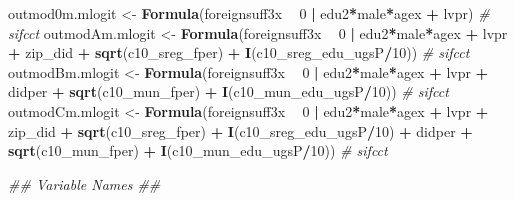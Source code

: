 \documentclass[
]{article}
\newenvironment{Shaded}{\begin{snugshade}}{\end{snugshade}}
\newcommand{\CommentTok}[1]{\textcolor[rgb]{0.56,0.35,0.01}{\textit{#1}}}
\newcommand{\DecValTok}[1]{\textcolor[rgb]{0.00,0.00,0.81}{#1}}
\newcommand{\KeywordTok}[1]{\textcolor[rgb]{0.13,0.29,0.53}{\textbf{#1}}}
\newcommand{\NormalTok}[1]{#1}
\newcommand{\OperatorTok}[1]{\textcolor[rgb]{0.81,0.36,0.00}{\textbf{#1}}}
\newcommand{\StringTok}[1]{\textcolor[rgb]{0.31,0.60,0.02}{#1}}
\begin{document}
\begin{Shaded}
\begin{Highlighting}[]
\NormalTok{outmod0m.mlogit <-}\StringTok{ }\KeywordTok{Formula}\NormalTok{(foreignsuff3x  }\OperatorTok{~}\StringTok{ }\DecValTok{0} \OperatorTok{|}\StringTok{ }\NormalTok{edu2}\OperatorTok{*}\NormalTok{male}\OperatorTok{*}\NormalTok{agex }\OperatorTok{+}\StringTok{ }\NormalTok{lvpr) }\CommentTok{# sifcct}
\NormalTok{outmodAm.mlogit <-}\StringTok{ }\KeywordTok{Formula}\NormalTok{(foreignsuff3x  }\OperatorTok{~}\StringTok{ }\DecValTok{0} \OperatorTok{|}\StringTok{ }\NormalTok{edu2}\OperatorTok{*}\NormalTok{male}\OperatorTok{*}\NormalTok{agex }\OperatorTok{+}\StringTok{ }\NormalTok{lvpr }\OperatorTok{+}\StringTok{  }
\StringTok{                             }\NormalTok{zip_did }\OperatorTok{+}\StringTok{ }\KeywordTok{sqrt}\NormalTok{(c10_sreg_fper) }\OperatorTok{+}\StringTok{ }\KeywordTok{I}\NormalTok{(c10_sreg_edu_ugsP}\OperatorTok{/}\DecValTok{10}\NormalTok{)) }\CommentTok{# sifcct}
\NormalTok{outmodBm.mlogit <-}\StringTok{ }\KeywordTok{Formula}\NormalTok{(foreignsuff3x  }\OperatorTok{~}\StringTok{ }\DecValTok{0} \OperatorTok{|}\StringTok{ }\NormalTok{edu2}\OperatorTok{*}\NormalTok{male}\OperatorTok{*}\NormalTok{agex }\OperatorTok{+}\StringTok{ }\NormalTok{lvpr }\OperatorTok{+}\StringTok{  }
\StringTok{                             }\NormalTok{didper }\OperatorTok{+}\StringTok{ }\KeywordTok{sqrt}\NormalTok{(c10_mun_fper) }\OperatorTok{+}\StringTok{ }\KeywordTok{I}\NormalTok{(c10_mun_edu_ugsP}\OperatorTok{/}\DecValTok{10}\NormalTok{)) }\CommentTok{# sifcct}
\NormalTok{outmodCm.mlogit <-}\StringTok{ }\KeywordTok{Formula}\NormalTok{(foreignsuff3x  }\OperatorTok{~}\StringTok{ }\DecValTok{0} \OperatorTok{|}\StringTok{ }\NormalTok{edu2}\OperatorTok{*}\NormalTok{male}\OperatorTok{*}\NormalTok{agex }\OperatorTok{+}\StringTok{ }\NormalTok{lvpr }\OperatorTok{+}\StringTok{  }
\StringTok{                             }\NormalTok{zip_did }\OperatorTok{+}\StringTok{ }\KeywordTok{sqrt}\NormalTok{(c10_sreg_fper) }\OperatorTok{+}\StringTok{ }\KeywordTok{I}\NormalTok{(c10_sreg_edu_ugsP}\OperatorTok{/}\DecValTok{10}\NormalTok{) }\OperatorTok{+}\StringTok{ }
\StringTok{                             }\NormalTok{didper }\OperatorTok{+}\StringTok{ }\KeywordTok{sqrt}\NormalTok{(c10_mun_fper) }\OperatorTok{+}\StringTok{ }\KeywordTok{I}\NormalTok{(c10_mun_edu_ugsP}\OperatorTok{/}\DecValTok{10}\NormalTok{)) }\CommentTok{# sifcct}

\CommentTok{## Variable Names ##}


\end{Highlighting}
\end{Shaded}
\end{document}
